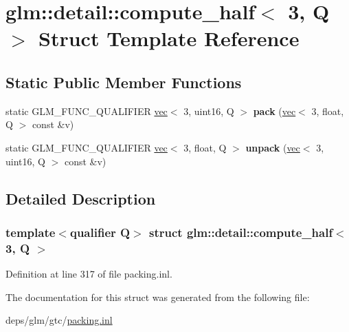 \hypertarget{structglm_1_1detail_1_1compute__half_3_013_00_01Q_01_4}{}\section{glm\+:\+:detail\+:\+:compute\+\_\+half$<$ 3, Q $>$ Struct Template Reference}
\label{structglm_1_1detail_1_1compute__half_3_013_00_01Q_01_4}
\subsection*{Static Public Member Functions}
\begin{DoxyCompactItemize}
\item 
\mbox{\label{structglm_1_1detail_1_1compute__half_3_013_00_01Q_01_4_a87afcb72dac066fcd514bbd8071980d8}} 
static G\+L\+M\+\_\+\+F\+U\+N\+C\+\_\+\+Q\+U\+A\+L\+I\+F\+I\+ER \hyperlink{structglm_1_1vec}{vec}$<$ 3, uint16, Q $>$ {\bfseries pack} (\hyperlink{structglm_1_1vec}{vec}$<$ 3, float, Q $>$ const \&v)
\item 
\mbox{\label{structglm_1_1detail_1_1compute__half_3_013_00_01Q_01_4_a888b7245229f861127dedbacf10e1568}} 
static G\+L\+M\+\_\+\+F\+U\+N\+C\+\_\+\+Q\+U\+A\+L\+I\+F\+I\+ER \hyperlink{structglm_1_1vec}{vec}$<$ 3, float, Q $>$ {\bfseries unpack} (\hyperlink{structglm_1_1vec}{vec}$<$ 3, uint16, Q $>$ const \&v)
\end{DoxyCompactItemize}


\subsection{Detailed Description}
\subsubsection*{template$<$qualifier Q$>$\newline
struct glm\+::detail\+::compute\+\_\+half$<$ 3, Q $>$}



Definition at line 317 of file packing.\+inl.



The documentation for this struct was generated from the following file\+:\begin{DoxyCompactItemize}
\item 
deps/glm/gtc/\hyperlink{packing_8inl}{packing.\+inl}\end{DoxyCompactItemize}
